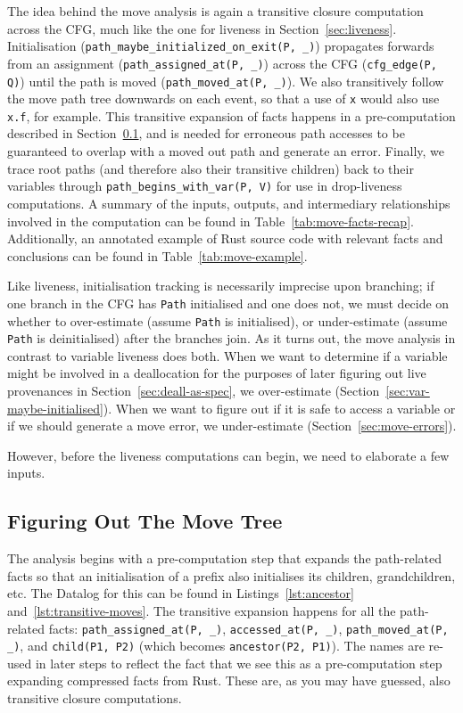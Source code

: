 \documentclass[11pt,a4paper,twoside,openany,draft]{report}
\newcommand{\InRust}[1]{\texttt{#1}}
\newcommand{\InDatalog}[1]{\texttt{#1}}
\begin{document}
The idea behind the move analysis is again a transitive closure computation
across the CFG, much like the one for liveness in Section~\ref{sec:liveness}.
Initialisation (\InDatalog{path_maybe_initialized_on_exit(P, _)}) propagates
forwards from an assignment (\InDatalog{path_assigned_at(P, _)}) across the CFG
(\InDatalog{cfg_edge(P, Q)}) until the path is moved (\InDatalog{path_moved_at(P,
  _)}). We also transitively follow the move path tree downwards on each event,
so that a use of \InRust{x} would also use \InRust{x.f}, for example. This
transitive expansion of facts happens in a pre-computation described in
Section~\ref{sec:move:fixpoints}, and is needed for erroneous path accesses to
be guaranteed to overlap with a moved out path and generate an error. Finally,
we trace root paths (and therefore also their transitive children) back to their
variables through \InDatalog{path_begins_with_var(P, V)} for use in
drop-liveness computations. A summary of the inputs, outputs, and intermediary
relationships involved in the computation can be found in
Table~\ref{tab:move-facts-recap}. Additionally, an annotated example of Rust
source code with relevant facts and conclusions can be found in
Table~\ref{tab:move-example}.

Like liveness, initialisation tracking is necessarily imprecise upon branching;
if one branch in the CFG has \InDatalog{Path} initialised and one does not, we
must decide on whether to over-estimate (assume \InDatalog{Path} is
initialised), or under-estimate (assume \InDatalog{Path} is deinitialised) after
the branches join. As it turns out, the move analysis in contrast to variable
liveness does both. When we want to determine if a variable might be involved in
a deallocation for the purposes of later figuring out live provenances in
Section~\ref{sec:deall-as-spec}, we over-estimate
(Section~\ref{sec:var-maybe-initialised}). When we want to figure out if it is
safe to access a variable or if we should generate a move error, we
under-estimate (Section~\ref{sec:move-errors}).

However, before the liveness computations can begin, we need to elaborate a few
inputs.

\subsection{Figuring Out The Move Tree}\label{sec:move:fixpoints}

The analysis begins with a pre-computation step that expands the path-related
facts so that an initialisation of a prefix also initialises its children,
grandchildren, etc. The Datalog for this can be found in
Listings~\ref{lst:ancestor} and~\ref{lst:transitive-moves}. The transitive
expansion happens for all the path-related facts: \InDatalog{path_assigned_at(P,
  _)}, \InDatalog{accessed_at(P, _)}, \InDatalog{path_moved_at(P, _)}, and
\InDatalog{child(P1, P2)} (which becomes \InDatalog{ancestor(P2, P1)}). The
names are re-used in later steps to reflect the fact that we see this as a
pre-computation step expanding compressed facts from Rust. These are, as you may
have guessed, also transitive closure computations.
\end{document}
